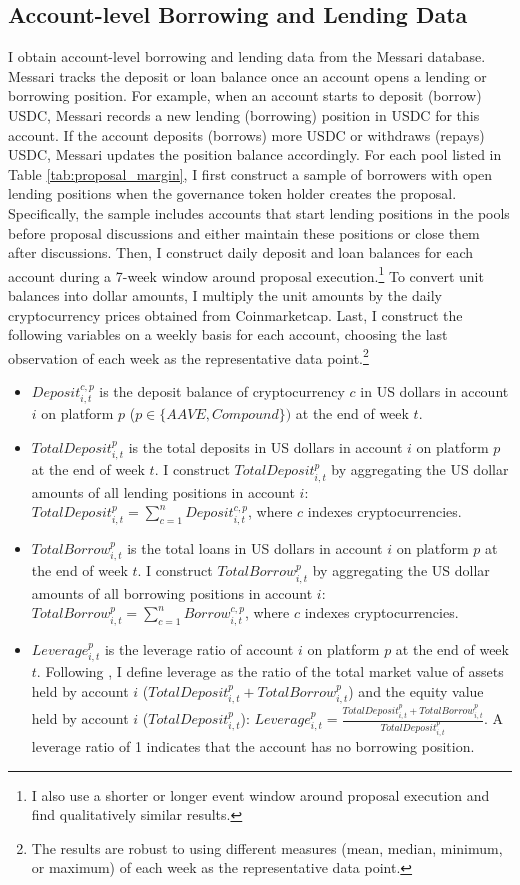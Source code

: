 \documentclass[12pt]{article}
\begin{document}
\subsection{Account-level Borrowing and Lending Data}
I obtain account-level borrowing and lending data from the Messari database. Messari tracks the deposit or loan balance once an account opens a lending or borrowing position. For example, when an account starts to deposit (borrow) USDC, Messari records a new lending (borrowing) position in USDC for this account. If the account deposits (borrows) more USDC or withdraws (repays) USDC, Messari updates the position balance accordingly. For each pool listed in Table \ref{tab:proposal_margin}, I first construct a sample of borrowers with open lending positions when the governance token holder creates the proposal. Specifically, the sample includes accounts that start lending positions in the pools before proposal discussions and either maintain these positions or close them after discussions. Then, I construct daily deposit and loan balances for each account during a 7-week window around proposal execution.\footnote{I also use a shorter or longer event window around proposal execution and find qualitatively similar results.} To convert unit balances into dollar amounts, I multiply the unit amounts by the daily cryptocurrency prices obtained from Coinmarketcap. Last, I construct the following variables on a weekly basis for each account, choosing the last observation of each week as the representative data point.\footnote{The results are robust to using different measures (mean, median, minimum, or maximum) of each week as the representative data point.}
\begin{itemize}
    \item $Deposit_{i,t}^{c,p}$ is the deposit balance of cryptocurrency $c$ in US dollars in account $i$ on platform $p$ ($p\in\{AAVE,Compound\})$ at the end of week $t$. 
    \item $TotalDeposit_{i,t}^p$ is the total deposits in US dollars in account $i$ on platform $p$ at the end of week $t$. I construct $TotalDeposit_{i,t}^p$ by aggregating the US dollar amounts of all lending positions in account $i$: $TotalDeposit_{i,t}^p = \sum_{c=1}^nDeposit_{i,t}^{c,p}$, where $c$ indexes cryptocurrencies.
  \item $TotalBorrow_{i,t}^p$ is the total loans in US dollars in account $i$ on platform $p$ at the end of week $t$. I construct $TotalBorrow_{i,t}^p$ by aggregating the US dollar amounts of all borrowing positions in account $i$: $TotalBorrow_{i,t}^p = \sum_{c=1}^nBorrow_{i,t}^{c,p}$, where $c$ indexes cryptocurrencies.
 \item $Leverage_{i,t}^{p}$ is the leverage ratio of account $i$ on platform $p$ at the end of week $t$. Following \cite{bian2021margin}, I define leverage as the ratio of the total market value of assets held by account $i$ ($TotalDeposit_{i,t}^p+Total Borrow_{i,t}^p$) and the equity value held by account $i$ ($Total Deposit_{i,t}^p$): $ Leverage_{i,t}^p= \frac{Total Deposit_{i,t}^p+Total Borrow_{i,t}^p}{Total Deposit_{i,t}^p}.$ A leverage ratio of 1 indicates that the account has no borrowing position.

\end{itemize}
\end{document}
